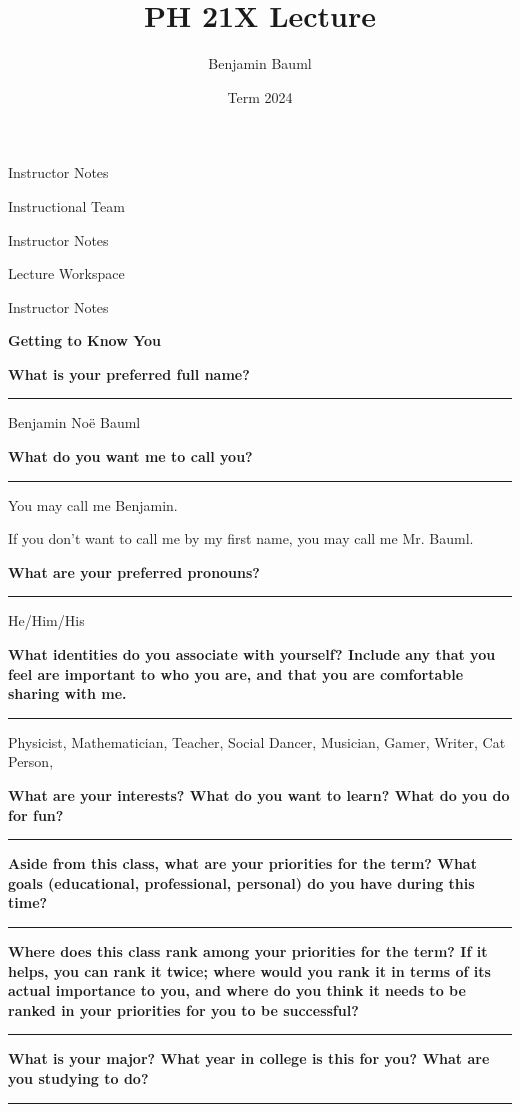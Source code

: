 \documentclass[]{article}
\title{PH 21X Lecture \Lec}
\author{Benjamin Bauml}
\date{Term 2024}
\begin{document}
\begin{TeacherMargin}
Instructor Notes
\end{TeacherMargin}
\begin{PresentSpace}
Instructional Team
\end{PresentSpace}
\newpage
\begin{TeacherMargin}
Instructor Notes
\end{TeacherMargin}
\begin{PresentSpace}
Lecture Workspace
\end{PresentSpace}
\newpage
\begin{TeacherMargin}
Instructor Notes
\end{TeacherMargin}
\begin{PresentSpace}
\begin{center}
	\textbf{Getting to Know You}
\end{center}
\textbf{What is your preferred full name?}
{\color{blue}\hrule}
\begin{center}
	Benjamin No\"{e} Bauml
\end{center}
\textbf{What do you want me to call you?}
{\color{blue}\hrule}
\begin{center}
	You may call me Benjamin.
	
	If you don't want to call me by my first name, you may call me Mr. Bauml.
\end{center}
\textbf{What are your preferred pronouns?}
{\color{blue}\hrule}
\begin{center}
	He/Him/His
\end{center}
\textbf{What identities do you associate with yourself? Include any that you feel are important to who you are, and that you are comfortable sharing with me.}
{\color{blue}\hrule}
\begin{center}
	Physicist, Mathematician, Teacher, Social Dancer, Musician, Gamer, Writer, Cat Person, 
\end{center}
\textbf{What are your interests? What do you want to learn? What do you do for fun?}
{\color{blue}\hrule}
\vspace{10pt}

\noindent\textbf{Aside from this class, what are your priorities for the term? What goals (educational, professional, personal) do you have during this time?}
{\color{blue}\hrule}
\vspace{10pt}

\noindent\textbf{Where does this class rank among your priorities for the term? If it helps, you can rank it twice; where would you rank it in terms of its actual importance to you, and where do you think it needs to be ranked in your priorities for you to be successful?}
{\color{blue}\hrule}
\vspace{10pt}

\noindent\textbf{What is your major? What year in college is this for you? What are you studying to do?}
{\color{blue}\hrule}
\vspace{2pt}
\end{PresentSpace}
\end{document}
